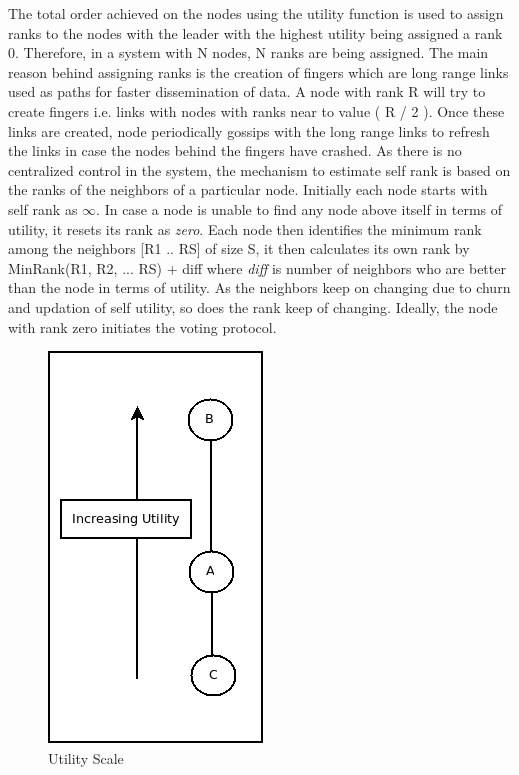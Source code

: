 \documentclass[a4paper,11pt]{kth-mag}
\begin{document}
The total order achieved on the nodes using the utility function is used to assign ranks to the nodes with the leader with the highest utility being assigned a rank 0. Therefore, in a system with N nodes, N ranks are being assigned. The main reason behind assigning ranks is the creation of fingers which are long range links used as paths for faster dissemination of data. A node with rank R will try to create fingers i.e. links with nodes with ranks near to value ( R / 2 ). Once these links are created, node periodically gossips with the long range links to refresh the links in case the nodes behind the fingers have crashed. As there is no centralized control in the system, the mechanism to estimate self rank is based on the ranks of the neighbors of a particular node. Initially each node starts with self rank as $ \infty $. In case a node is unable to find any node above itself in terms of utility, it resets its rank as \textit{zero}. Each node then identifies the minimum rank among the neighbors [R1 .. RS] of size S, it then calculates its own rank by MinRank(R1, R2, ... RS) + diff  where \textit{diff} is number of neighbors who are better than the node in terms of utility. As the neighbors keep on changing due to churn and updation of self utility, so does the rank keep of changing. Ideally, the node with rank zero initiates the voting protocol.

\begin{figure}[h]
	\centering
	\includegraphics[scale=0.5]{preference}
	\caption{Utility Scale}
	\label{fig:preference}
\end{figure}
\end{document}
